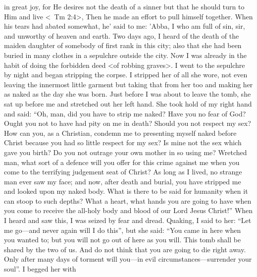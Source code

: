 in great joy, for He desires not the death of a sinner but that he
should turn to Him and live <\ Tm 2:4>, Then he made an effort
to pull himself together.
When his tears had abated somewhat, he'
said to me: 'Abba, I who am full of sin, sir, and unworthy of
heaven and earth.
Two days ago, I heard of the death of the maiden
daughter of somebody of first rank in this city; also that she had
been buried in many clothes in a sepulchre outside the city.
Now I
was already in the habit of doing the forbidden deed <of robbing
graves>.
I went to the sepulchre by night and began stripping the
corpse.
I stripped her of all she wore, not even leaving the innermost
little garment but taking that from her too and making her as naked
as the day she was born.
Just before I was about to leave the tomb,
she sat up before me and stretched out her left hand.
She took hold
of my right hand and said: “Oh, man, did you have to strip me
naked? Have you no fear of God? Ought you not to have had pity
on me in death? Should you not respect my sex? How can you, as
a Christian, condemn me to presenting myself naked before Christ
because you had so little respect for my sex? Is mine not the sex
which gave you birth? Do you not outrage your own mother in so
using me? Wretched man, what sort of a defence will you offer for
this crime against me when you come to the terrifying judgement
seat of Christ? As long as I lived, no strange man ever saw my face;
and now, after death and burial, you have stripped me and looked
upon my naked body.
What is there to be said for humanity when
it can stoop to such depths? What a heart, what hands you are
going to have when you come to receive the all-holy body and
blood of our Lord Jesus Christ!” When I heard and saw this, I was
seized by fear and dread.
Quaking, I said to her: “Let me go—and
never again will I do this”, but she said: “You came in here when
you wanted to; but you will not go out of here as you will.
This
tomb shall be shared by the two of us.
And do not think that you
are going to die right away.
Only after many days of torment will
you—in evil circumstances—surrender your soul”.
I begged her with

